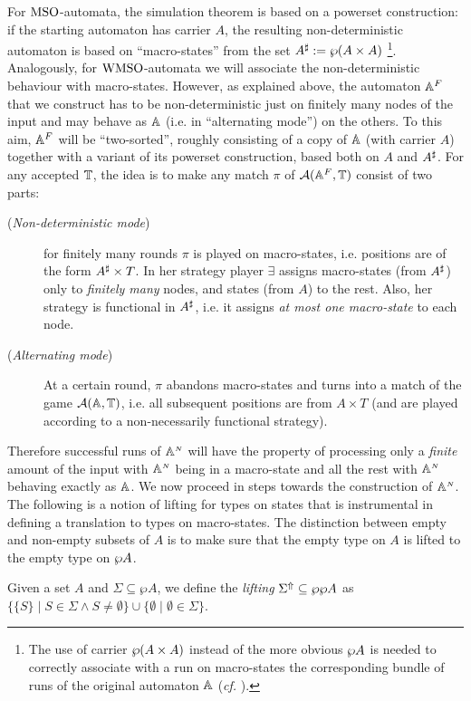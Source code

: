 For $\mathrm{MSO}$-automata, the simulation theorem is based on a powerset construction: 
if the starting automaton has carrier $A$, the resulting non-deterministic 
automaton is based on ``macro-states'' from the set $A^{\sharp} := \wp (A \times A)$%
\footnote{The use of carrier $\wp (A \times A)$ instead of the more obvious 
  $\wp A$ is needed to correctly associate with a run on macro-states the 
  corresponding bundle of runs of the original automaton $\mathbb{A}$ (\emph{cf.} 
  \cite{Walukiewicz96}).
  }.
Analogously, for $\mathrm{WMSO}$-automata we will associate the non-deterministic 
behaviour with macro-states. 
However, as explained above, the automaton $\mathbb{A}^{F}$ that we construct has to 
be non-deterministic just on finitely many nodes of the input and may behave as
$\mathbb{A}$ (i.e. in ``alternating mode'') on the others. 
To this aim, $\mathbb{A}^{F}$ will be ``two-sorted'', roughly consisting of a copy of
$\mathbb{A}$ (with carrier $A$) together with a variant of its powerset construction, 
based both on $A$ and $A^{\sharp}$. 
For any accepted $\mathbb{T}$, the idea is to make any match $\pi$ of 
$\mathcal{A}(\mathbb{A}^{F},\mathbb{T})$ consist of two parts:
\begin{description}
\item[(\textit{Non-deterministic mode})] for finitely many rounds $\pi$ is 
  played on macro-states, i.e. positions are of the form $A^{\sharp} \times T$. 
  In her strategy player $\exists$ assigns macro-states (from $A^{\sharp}$) only to 
  \emph{finitely many} nodes, and states (from $A$) to the rest. 
  Also, her strategy is functional in $A^{\sharp}$, i.e. it assigns \emph{at most one
  macro-state} to each node.
\item[(\textit{Alternating mode})] At a certain round, $\pi$ abandons 
  macro-states and turns into a match of the game $\mathcal{A}(\mathbb{A},\mathbb{T})$, i.e. all
  subsequent positions are from $A \times T$ (and are played according to a 
  non-necessarily functional strategy).
\end{description}
Therefore successful runs of $\mathbb{A}^{{\scriptscriptstyle N}}$ will have the property of processing only a \emph{finite} amount of the input with $\mathbb{A}^{{\scriptscriptstyle N}}$ being in a macro-state and all the rest with $\mathbb{A}^{{\scriptscriptstyle N}}$ behaving exactly as $\mathbb{A}$. We now proceed in steps towards the construction of $\mathbb{A}^{{\scriptscriptstyle N}}$. The following is a notion of lifting for types on states that is instrumental in defining a translation to types on macro-states. 
The distinction between empty and non-empty subsets of $A$ is to make sure that 
the empty type on $A$ is lifted to the empty type on $\wp A$.
\begin{definition}
Given a set $A$ and $\Sigma \subseteq \wp A$, we define the \emph{lifting} $\Sigma^{\Uparrow} \subseteq \wp \wp A$ as $\{\{S\} \mid S \in \Sigma \wedge S \neq \emptyset\} \cup
    \{\emptyset \mid \emptyset \in \Sigma \}$.
\end{definition}

